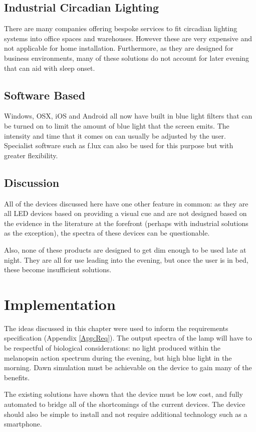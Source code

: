 \subsection{Industrial Circadian Lighting}

There are many companies offering bespoke services to fit circadian lighting systems into office spaces and warehouses. However these are very expensive and not applicable for home installation. Furthermore, as they are designed for business environments, many of these solutions do not account for later evening that can aid with sleep onset.

\subsection{Software Based}

Windows, OSX, iOS and Android all now have built in blue light filters that can be turned on to limit the amount of blue light that the screen emits. The intensity and time that it comes on can usually be adjusted by the user. Specialist software such as f.lux can also be used for this purpose but with greater flexibility.

\subsection{Discussion}

All of the devices discussed here have one other feature in common: as they are all LED devices based on providing a visual cue and are not designed based on the evidence in the literature at the forefront (perhaps with industrial solutions as the exception), the spectra of these devices can be questionable.

Also, none of these products are designed to get dim enough to be used late at night. They are all for use leading into the evening, but once the user is in bed, these become insufficient solutions.

\section{Implementation}

The ideas discussed in this chapter were used to inform the requirements specification (Appendix \ref{App:Req}). The output spectra of the lamp will have to be respectful of biological considerations: no light produced within the melanopsin action spectrum during the evening, but high blue light in the morning. Dawn simulation must be achievable on the device to gain many of the benefits.

The existing solutions have shown that the device must be low cost, and fully automated to bridge all of the shortcomings of the current devices. The device should also be simple to install and not require additional technology such as a smartphone.